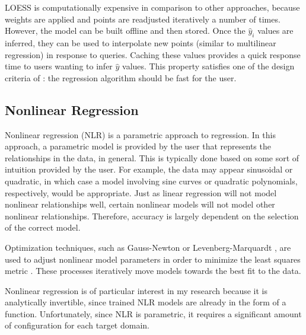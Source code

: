 LOESS is computationally expensive in comparison to other approaches,
because weights are applied and points are readjusted iteratively a number of times.
However, the model can be built offline and then stored.
Once the $\hat y_i$ values are inferred, they can be used to interpolate new points (similar to multilinear regression) in response to queries.
Caching these values provides a quick response time to users wanting to infer $\hat y$ values.
This property satisfies one of the design criteria of \fw: the regression algorithm should be fast for the user.


\subsection{Nonlinear Regression}

Nonlinear regression (NLR) is a parametric approach to regression.
In this approach, a parametric model is provided by the user that represents the relationships in the data, in general.
This is typically done based on some sort of intuition provided by the user.
For example, the data may appear sinusoidal or quadratic, in which case a model involving sine curves or quadratic polynomials, respectively, would be appropriate.
Just as linear regression will not model nonlinear relationships well, certain nonlinear models will not model other nonlinear relationships.
Therefore, accuracy is largely dependent on the selection of the correct model.

Optimization techniques, such as Gauss-Newton or Levenberg-Marquardt \cite{mor1977levenberg}, are used to adjust nonlinear model parameters in order to minimize the least squares metric \cite{gallant1975nonlinear}.
These processes iteratively move models towards the best fit to the data.

Nonlinear regression is of particular interest in my research because it is analytically invertible, since trained NLR models are already in the form of a function.
Unfortunately, since NLR is parametric, it requires a significant amount of configuration for each target domain.

